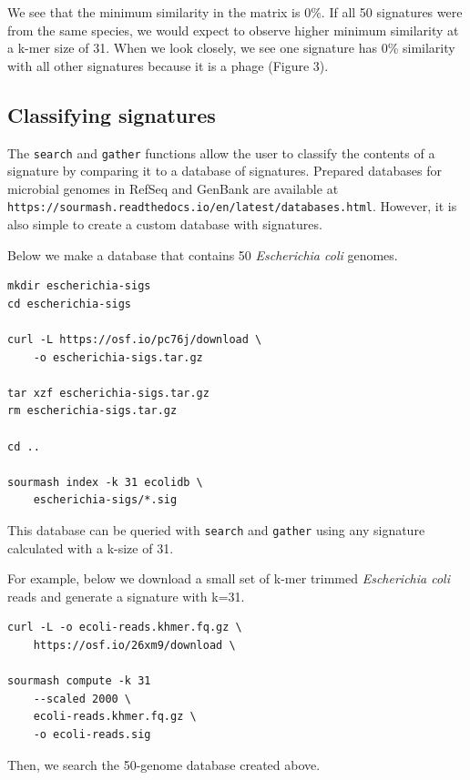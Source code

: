 \documentclass[10pt,a4paper,twocolumn]{article}
\begin{document}
We see that the minimum similarity in the matrix is 0\%. If all 50 signatures were from the same species, we would expect to observe higher minimum similarity at a k-mer size of 31. When we look closely, we see one signature has 0\% similarity with all other signatures because it is a phage (Figure 3).

\subsection*{Classifying signatures}

The \lstinline{search} and \lstinline{gather} functions allow the user to classify the contents of a signature by comparing it to a database of signatures. Prepared databases for microbial genomes in RefSeq and GenBank are available at \lstinline{https://sourmash.readthedocs.io/en/latest/databases.html}. However, it is also simple to create a custom database with signatures. 

\bigskip

Below we make a database that contains 50 \textit{Escherichia coli} genomes.


\begin{lstlisting}
mkdir escherichia-sigs
cd escherichia-sigs

curl -L https://osf.io/pc76j/download \ 
    -o escherichia-sigs.tar.gz    

tar xzf escherichia-sigs.tar.gz
rm escherichia-sigs.tar.gz

cd ..

sourmash index -k 31 ecolidb \ 
    escherichia-sigs/*.sig
\end{lstlisting}

\smallskip

This database can be queried with \lstinline{search} and \lstinline{gather} using any signature calculated with a k-size of 31.


For example, below we download a small set of k-mer trimmed \textit{Escherichia coli} reads and generate a signature with k=31.

\smallskip

\begin{lstlisting}
curl -L -o ecoli-reads.khmer.fq.gz \ 
    https://osf.io/26xm9/download \ 
    
sourmash compute -k 31 
    --scaled 2000 \ 
    ecoli-reads.khmer.fq.gz \  
    -o ecoli-reads.sig
\end{lstlisting}

Then, we search the 50-genome database created above.
\end{document}
